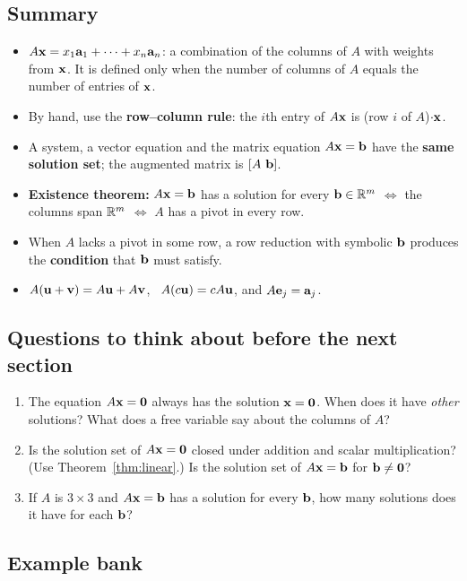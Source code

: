 \documentclass[11pt]{article}
\begin{document}
\subsection*{Summary}
\begin{itemize}
  \item $A\mathbf{x}=x_1\mathbf{a}_1+\cdots+x_n\mathbf{a}_n$: a combination of the columns of $A$ with weights from $\mathbf{x}$. It is defined only when the number of columns of $A$ equals the number of entries of $\mathbf{x}$.
  \item By hand, use the \textbf{row--column rule}: the $i$th entry of $A\mathbf{x}$ is (row $i$ of $A$)$\cdot\mathbf{x}$.
  \item A system, a vector equation and the matrix equation $A\mathbf{x}=\mathbf{b}$ have the \textbf{same solution set}; the augmented matrix is $[A\ \mathbf{b}]$.
  \item \textbf{Existence theorem:} $A\mathbf{x}=\mathbf{b}$ has a solution for every $\mathbf{b}\in\mathbb{R}^m$ $\iff$ the columns span $\mathbb{R}^m$ $\iff$ $A$ has a pivot in every row.
  \item When $A$ lacks a pivot in some row, a row reduction with symbolic $\mathbf{b}$ produces the \textbf{condition} that $\mathbf{b}$ must satisfy.
  \item $A(\mathbf{u}+\mathbf{v})=A\mathbf{u}+A\mathbf{v}$, \ $A(c\mathbf{u})=cA\mathbf{u}$, and $A\mathbf{e}_j=\mathbf{a}_j$.
\end{itemize}
 
\subsection*{Questions to think about before the next section}
\begin{enumerate}
  \item The equation $A\mathbf{x}=\mathbf{0}$ always has the solution $\mathbf{x}=\mathbf{0}$. When does it have \emph{other} solutions? What does a free variable say about the columns of $A$?
  \item Is the solution set of $A\mathbf{x}=\mathbf{0}$ closed under addition and scalar multiplication? (Use Theorem~\ref{thm:linear}.) Is the solution set of $A\mathbf{x}=\mathbf{b}$ for $\mathbf{b}\neq\mathbf{0}$?
  \item If $A$ is $3\times3$ and $A\mathbf{x}=\mathbf{b}$ has a solution for every $\mathbf{b}$, how many solutions does it have for each $\mathbf{b}$?
\end{enumerate}
 
\subsection*{Example bank}
\end{document}
